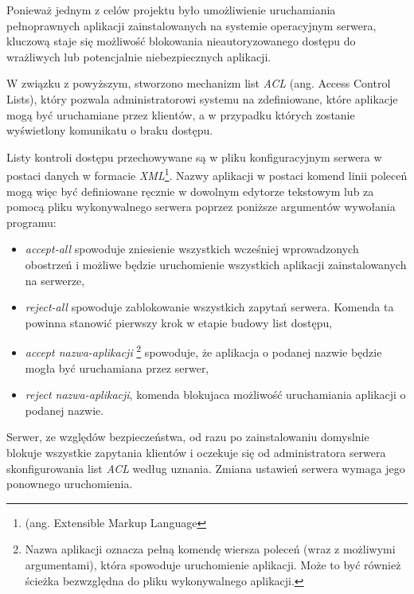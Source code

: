 Ponieważ jednym z celów projektu było umożliwienie uruchamiania pełnoprawnych aplikacji zainstalowanych na systemie operacyjnym serwera, kluczową staje się możliwość blokowania nieautoryzowanego dostępu do wrażliwych lub potencjalnie niebezpiecznych aplikacji.

W związku z powyższym, stworzono mechanizm list \emph{ACL} (ang. Access Control Lists), który pozwala administratorowi systemu na zdefiniowane, które aplikacje mogą być uruchamiane przez klientów, a w przypadku których zostanie wyświetlony komunikatu o braku dostępu.

Listy kontroli dostępu przechowywane są w pliku konfiguracyjnym serwera w postaci danych w formacie \emph{XML}\footnote{(ang. Extensible Markup Language}. Nazwy aplikacji w postaci komend linii poleceń mogą więc być definiowane ręcznie w dowolnym edytorze tekstowym lub za pomocą pliku wykonywalnego serwera poprzez poniższe argumentów wywołania programu:

\begin{itemize}
\item \emph{accept-all}
spowoduje zniesienie wszystkich wcześniej wprowadzonych obostrzeń i możliwe będzie uruchomienie wszystkich aplikacji zainstalowanych na serwerze,
\item \emph{reject-all}
spowoduje zablokowanie wszystkich zapytań serwera. Komenda ta powinna stanowić pierwszy krok w etapie budowy list dostępu,
\item \emph{accept nazwa-aplikacji} \footnote{Nazwa aplikacji oznacza pełną komendę wiersza poleceń (wraz z możliwymi argumentami), która spowoduje uruchomienie aplikacji. Może to być również ścieżka bezwzględna do pliku wykonywalnego aplikacji.}
spowoduje, że aplikacja o podanej nazwie będzie mogła być uruchamiana przez serwer,
\item \emph{reject nazwa-aplikacji},
komenda blokujaca możliwość uruchamiania aplikacji o podanej nazwie.
\end{itemize}

Serwer, ze względów bezpieczeństwa, od razu po zainstalowaniu domyslnie blokuje wszystkie zapytania klientów i oczekuje się od administratora serwera skonfigurowania list \emph{ACL} według uznania. Zmiana ustawień serwera wymaga jego ponownego uruchomienia.
